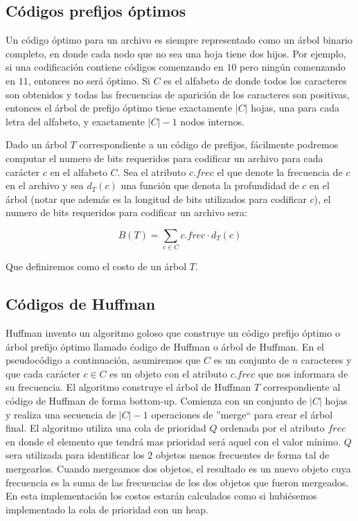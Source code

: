 \subsection{C\'odigos prefijos \'optimos}

Un c\'odigo \'optimo para un archivo es siempre representado como un \'arbol binario completo, en donde cada nodo que no sea una hoja tiene dos hijos. Por ejemplo, si una codificaci\'on contiene c\'odigos comenzando en $10$ pero ning\'un comenzando en $11$, entonces no ser\'a \'optimo. Si $C$ es el alfabeto de donde todos los caracteres son obtenidos y todas las frecuencias de aparici\'on de los caracteres son positivas, entonces el \'arbol de prefijo \'optimo tiene exactamente $|C|$ hojas, una para cada letra del alfabeto, y exactamente $|C|-1$ nodos internos.

Dado un \'arbol $T$ correspondiente a un c\'odigo de prefijos, f\'acilmente podremos computar el numero de bits requeridos para codificar un archivo para cada car\'acter $c$ en el alfabeto $C$. Sea el atributo $c.frec$ el que denote la frecuencia de $c$ en el archivo y sea $d_T(c)$ una funci\'on que denota la profundidad de $c$ en el \'arbol (notar que adem\'as es la longitud de bits utilizados para codificar $c$), el numero de bits requeridos para codificar un archivo sera:

\begin{equation*}
 B(T) = \sum_{c \in C} c.frec \cdot d_T(c)
\end{equation*}

Que definiremos como el costo de un \'arbol $T$.

\subsection{C\'odigos de Huffman}

Huffman invento un algoritmo goloso que construye un c\'odigo prefijo \'optimo o \'arbol prefijo \'optimo llamado \'codigo de Huffman o \'arbol de Huffman. En el pseudoc\'odigo a continuaci\'on, asumiremos que $C$ es un conjunto de $n$ caracteres y que cada car\'acter $c \in C$ es un objeto con el atributo $c.frec$ que nos informara de su frecuencia. El algoritmo construye el \'arbol de Huffman $T$ correspondiente al c\'odigo de Huffman de forma bottom-up. Comienza con un conjunto de $|C|$ hojas y realiza una secuencia de $|C|-1$ operaciones de ''merge`` para crear el \'arbol final. El algoritmo utiliza una cola de prioridad $Q$ ordenada por el atributo $frec$ en donde el elemento que tendr\'a mas prioridad ser\'a aquel con el valor m\'inimo. $Q$ sera utilizada para identificar los $2$ objetos menos frecuentes de forma tal de mergearlos. Cuando mergeamos dos objetos, el resultado es un nuevo objeto cuya frecuencia es la suma de las frecuencias de los dos objetos que fueron mergeados. En esta implementaci\'on
los costos estar\'an calculados como si hubi\'esemos implementado la cola de prioridad con un heap.


